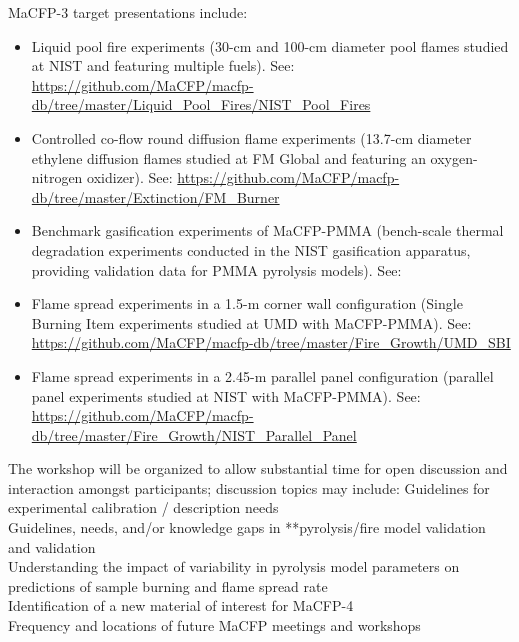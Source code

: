 \documentclass[12pt]{article}
\begin{document}
MaCFP-3 target presentations include:
\begin{itemize}[noitemsep]
\item Liquid pool fire experiments (30-cm and 100-cm diameter pool flames studied at NIST and featuring multiple fuels). See: \url{https://github.com/MaCFP/macfp-db/tree/master/Liquid_Pool_Fires/NIST_Pool_Fires}
\item Controlled co-flow round diffusion flame experiments (13.7-cm diameter ethylene diffusion flames studied at FM Global and featuring an oxygen-nitrogen oxidizer). See: \url{https://github.com/MaCFP/macfp-db/tree/master/Extinction/FM_Burner}
\item Benchmark gasification experiments of MaCFP-PMMA (bench-scale thermal degradation experiments conducted in the NIST gasification apparatus, providing validation data for PMMA pyrolysis models). See: %
\item Flame spread experiments in a 1.5-m corner wall configuration (Single Burning Item experiments studied at UMD with MaCFP-PMMA). See: \url{https://github.com/MaCFP/macfp-db/tree/master/Fire_Growth/UMD_SBI} 
\item Flame spread experiments in a 2.45-m parallel panel configuration (parallel panel experiments studied at NIST with MaCFP-PMMA). See: \url{https://github.com/MaCFP/macfp-db/tree/master/Fire_Growth/NIST_Parallel_Panel}

 \end{itemize}
 
The workshop will be organized to allow substantial time for open discussion and interaction amongst participants; discussion topics may include:
Guidelines for experimental calibration / description needs\\
Guidelines, needs, and/or knowledge gaps in **pyrolysis/fire model validation and validation\\
Understanding the impact of variability in pyrolysis model parameters on predictions of sample burning and flame spread rate \\
Identification of a new material of interest for MaCFP-4\\
Frequency and locations of future MaCFP meetings and workshops\\

\clearpage
\end{document}
